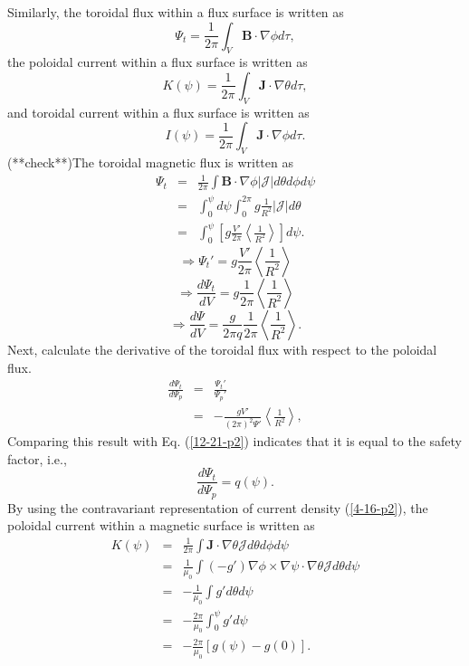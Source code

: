 \documentclass{llncs}
\begin{document}
Similarly, the toroidal flux within a flux surface is written as
\begin{equation}
  \Psi_t = \frac{1}{2 \pi} \int_V \mathbf{B} \cdot \nabla \phi d \tau,
\end{equation}
the poloidal current within a flux surface is written as
\begin{equation}
  K (\psi) = \frac{1}{2 \pi} \int_V \mathbf{J} \cdot \nabla \theta d \tau,
\end{equation}
and toroidal current within a flux surface is written as
\begin{equation}
  \label{4-18-1} I (\psi) = \frac{1}{2 \pi} \int_V \mathbf{J} \cdot \nabla
  \phi d \tau .
\end{equation}
(**check**)The toroidal magnetic flux is written as
\begin{eqnarray}
  \Psi_t & = & \frac{1}{2 \pi} \int \mathbf{B} \cdot \nabla \phi |\mathcal{J}|
  d \theta d \phi d \psi \nonumber\\
  & = & \int_0^{\psi} d \psi \int_0^{2 \pi} g \frac{1}{R^2} |\mathcal{J}| d
  \theta \nonumber\\
  & = & \int_0^{\psi} \left[ g \frac{V'}{2 \pi} \left\langle \frac{1}{R^2}
  \right\rangle \right] d \psi .  \label{4-7-p3}
\end{eqnarray}
\[ \Rightarrow \Psi_t' = g \frac{V'}{2 \pi} \left\langle \frac{1}{R^2}
   \right\rangle \]
\[ \Rightarrow \frac{d \Psi_t}{d V} = g \frac{1}{2 \pi} \left\langle
   \frac{1}{R^2} \right\rangle \]
\begin{equation}
  \Rightarrow \frac{d \Psi}{d V} = \frac{g}{2 \pi q}  \frac{1}{2 \pi}
  \left\langle \frac{1}{R^2} \right\rangle .
\end{equation}
Next, calculate the derivative of the toroidal flux with respect to the
poloidal flux.
\begin{eqnarray}
  \frac{d \Psi_t}{d \Psi_p} & = & \frac{\Psi_t'}{\Psi_p'} \nonumber\\
  & = & - \frac{g V'}{(2 \pi)^2 \Psi'}  \left\langle \frac{1}{R^2}
  \right\rangle,  \label{4-18-6}
\end{eqnarray}
Comparing this result with Eq. (\ref{12-21-p2}) indicates that it is equal to
the safety factor, i.e.,
\begin{equation}
  \label{5-14-3} \frac{d \Psi_t}{d \Psi_p} = q (\psi) .
\end{equation}
By using the contravariant representation of current density (\ref{4-16-p2}),
the poloidal current within a magnetic surface is written as
\begin{eqnarray}
  K (\psi) & = & \frac{1}{2 \pi} \int \mathbf{J} \cdot \nabla \theta
  \mathcal{J}d \theta d \phi d \psi \nonumber\\
  & = & \frac{1}{\mu_0} \int (- g') \nabla \phi \times \nabla \psi \cdot
  \nabla \theta \mathcal{J}d \theta d \psi \nonumber\\
  & = & - \frac{1}{\mu_0} \int g' d \theta d \psi \nonumber\\
  & = & - \frac{2 \pi}{\mu_0} \int_0^{\psi} g' d \psi \nonumber\\
  & = & - \frac{2 \pi}{\mu_0} [g (\psi) - g (0)] . 
\end{eqnarray}
\end{document}
